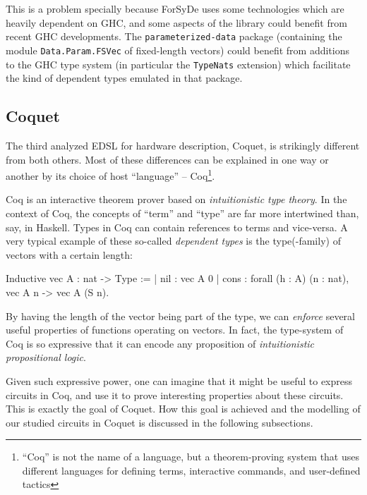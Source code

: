             This is a problem specially because ForSyDe uses some technologies which are heavily
            dependent on GHC, and some aspects of the library could benefit from recent GHC
            developments. The \texttt{parameterized-data} package (containing the module
            \texttt{Data.Param.FSVec} of fixed-length vectors) could benefit from additions to the
            GHC type system (in particular the \texttt{TypeNats}\cite{website:ghc-typenats}
            extension) which facilitate the kind of dependent types emulated in that package.


    \subsection{Coquet}
    \label{subsec:coquet}
        The third analyzed \ac{EDSL} for hardware description, Coquet\cite{coquet2011}, is strikingly
        different from both others. Most of these differences can be explained in one way or another
        by its choice of host ``language'' -- Coq\footnote{``Coq'' is not the name of a language,
            but a theorem-proving system that uses different languages for defining terms,
            interactive commands, and user-defined tactics}.

        Coq is an interactive theorem prover based on \emph{intuitionistic type theory}. In the
        context of Coq, the concepts of ``term'' and ``type'' are far more intertwined than, say, in
        Haskell. Types in Coq can contain references to terms and vice-versa. A very typical example
        of these so-called \emph{dependent types} is the type(-family) of vectors with a certain
        length:

        \begin{coqcode}
        Inductive vec A : nat -> Type :=
            | nil  : vec A 0
            | cons : forall (h : A) (n : nat),  vec A n -> vec A (S n).
        \end{coqcode}

        By having the length of the vector being part of the type, we can \emph{enforce} several
        useful properties of functions operating on vectors. In fact, the type-system of Coq is so
        expressive that it can encode any proposition of \emph{intuitionistic propositional logic}.

        Given such expressive power, one can imagine that it might be useful to express circuits in
        Coq, and use it to prove interesting properties about these circuits. This is exactly the
        goal of Coquet. How this goal is achieved and the modelling of our studied circuits in
        Coquet is discussed in the following subsections.

